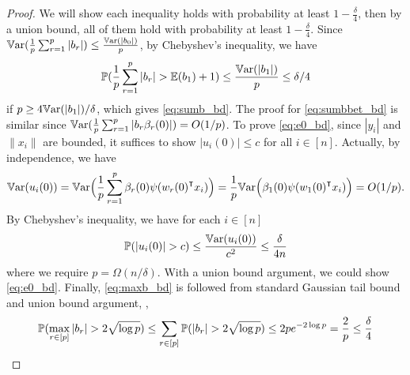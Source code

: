 \begin{proof}
We will show each inequality holds with probability at least $1-\frac{\delta}{4}$, then by a union bound, all of them hold with probability at least $1-\frac{\delta}{4}$. Since $\mathbb{V}\mathrm{ar}(\frac{1}{p}\sum_{r=1}^p|b_r|)\leq \frac{\mathbb{V}\mathrm{ar}(|b_0|)}{p}$, by Chebyshev's inequality, we have 
\begin{equation*}
    \operatorname{\mathbb{P}}(\frac{1}{p}\sum_{r=1}^p|b_r| > \mathbb{E}(b_1) + 1) \leq \frac{\mathbb{V}\mathrm{ar}(|b_1|)}{p} \leq \delta/4
\end{equation*} 
if $p\geq 4\mathbb{V}\mathrm{ar}(|b_1|)/\delta$, which gives \eqref{eq:sumb_bd}. The proof for \eqref{eq:sumbbet_bd} is similar since $\mathbb{V}\mathrm{ar}(\frac{1}{p}\sum_{r=1}^p|b_r\beta_r(0)|)=O(1/p)$. To prove \eqref{eq:e0_bd}, since $|y_i|$ and $\|x_i\|$ are bounded, it suffices to show $|u_i(0)|\leq c$ for all $i\in [n]$. Actually, by independence, we have
\begin{equation*}
    \Var(u_i(0)) = \Var \Big(\frac{1}{p}\sum_{r=1}^p \beta_r(0)\psi(w_r(0)\transpose x_i)\Big) = \frac{1}{p}\Var\Big(\beta_1(0)\psi(w_1(0)\transpose x_i)\Big) = O(1/p).
\end{equation*}
By Chebyshev's inequality, we have for each $i\in [n]$
\begin{equation*}
    \prob(|u_i(0)|> c) \leq \frac{\Var(u_i(0))}{c^2} \leq \frac{\delta}{4n}
\end{equation*}
where we require $p=\Omega(n/\delta)$. With a union bound argument, we could show \eqref{eq:e0_bd}. Finally, \eqref{eq:maxb_bd} is followed from standard Gaussian tail bound and union bound argument, \ie,
\begin{equation*}
    \operatorname{\mathbb{P}}(\max_{r\in[p]}|b_r| > 2\sqrt{\log p}) \leq \sum_{r\in [p]}\operatorname{\mathbb{P}}(|b_r| > 2\sqrt{\log p}) \leq 2pe^{-2\log p} = \frac{2}{p} \leq \frac{\delta}{4}
\end{equation*}
\end{proof}

